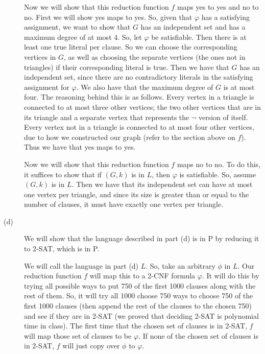 \documentclass{article}
\begin{document}
\begin{description}
        Now we will show that this reduction function $f$ maps yes to yes and
        no to no. First we will show yes maps to yes. So, given that $\varphi$
        has a satisfying assignment, we want to show that $G$ has an independent
        set and has a maximum degree of at most 4. So, let $\varphi$ be
        satisfiable. Then there is at least one true literal per clause. So
        we can choose the corresponding vertices in $G$, as well as choosing
        the separate vertices (the ones not in triangles) if their
        corresponding literal is true. Then we have that $G$ has an independent
        set, since there are no contradictory literals in the satisfying
        assignment for $\varphi$. We also have that the maximum degree of
        $G$ is at most four. The reasoning behind this is as follows. Every
        vertex in a triangle is connected to at most three other vertices; the
        two other vertices that are in its triangle and a separate vertex that
        represents the $\neg$ version of itself. Every vertex not in a triangle
        is connected to at most four other vertices, due to how we constructed
        our graph (refer to the section above on $f$). Thus we have that
        yes maps to yes.

        Now we will show that this reduction function $f$ maps no to no. To do
        this, it suffices to show that if $(G,k)$ is in $L$, then $\varphi$ is
        satisfiable. So, assume $(G,k)$ is in $L$. Then we have that its
        independent set can have at most one vertex per triangle, and since
        its size is greater than or equal to the number of clauses, it must
        have exactly one vertex per triangle.
    \item[(d)]
        We will show that the language described in part (d) is in P by
        reducing it to 2-SAT, which is in P.

        We will call the language in part (d) $L$. So, take an arbitrary
        $\phi$ in $L$. Our reduction function $f$ will map this to a 2-CNF
        formula $\varphi$. It will do this by trying all possible ways to put
        750 of the first 1000 clauses along with the rest of them. So, it will
        try all 1000 choose 750 ways to choose 750 of the first 1000 clauses
        (then append the rest of the clauses to the chosen 750)
        and see if they are in 2-SAT (we proved that deciding 2-SAT is polynomial
        time in class). The first time that the chosen set of clauses is in
        2-SAT, $f$ will map those set of clauses to be $\varphi$. If none of
        the chosen set of clauses is in 2-SAT,
        $f$ will just copy over $\phi$ to $\varphi$.


\end{description}
\end{document}
